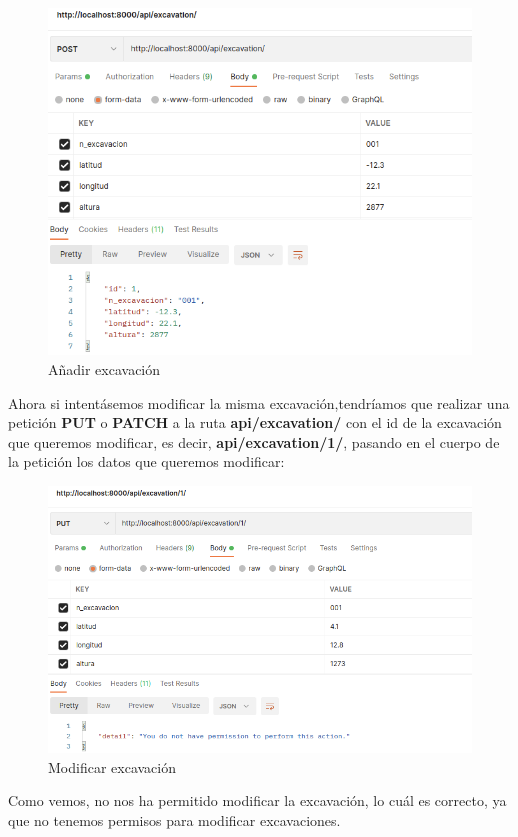         \begin{figure}[H]
            \centering
            \includegraphics[scale=0.40]{imagenes/post-excavation.png}
            \caption{Añadir excavación}
            \label{fig:post-excavation}
        \end{figure}

Ahora si intentásemos modificar la misma excavación,tendríamos que realizar una petición
\textbf{PUT} o \textbf{PATCH} a la ruta \textbf{api/excavation/} con el id de la excavación
que queremos modificar, es decir, \textbf{api/excavation/1/}, pasando en el cuerpo de la
petición los datos que queremos modificar:

        \begin{figure}[H]
            \centering
            \includegraphics[scale=0.40]{imagenes/put-excavation.png}
            \caption{Modificar excavación}
            \label{fig:put-excavation}
        \end{figure}

Como vemos, no nos ha permitido modificar la excavación, lo cuál es correcto, ya que no
tenemos permisos para modificar excavaciones.

